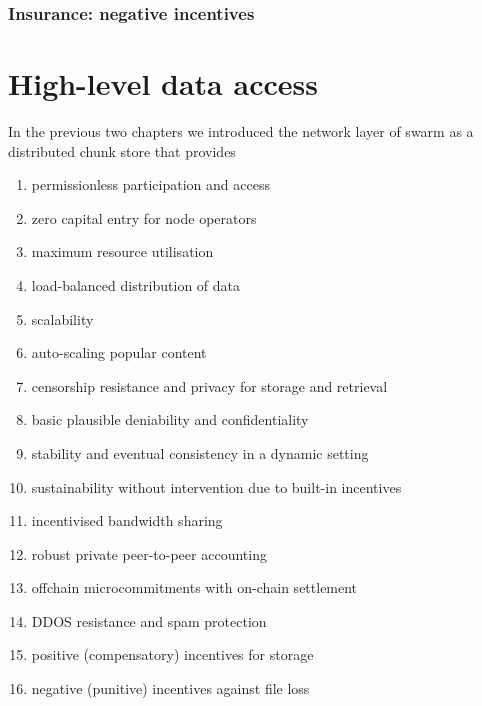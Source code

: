 \subsection{Insurance: negative incentives}\label{sec:chunk-insurace}








\chapter{High-level data access}\label{sec:high-level-data-access}

In the previous two chapters we introduced the network layer of swarm as a distributed chunk store that provides 

\begin{enumerate}
    \item permissionless participation and access
    \item zero capital entry for node operators
    \item maximum resource utilisation 
    \item load-balanced distribution of data
    \item scalability 
    \item auto-scaling popular content
    \item censorship resistance and privacy for storage and retrieval
    \item basic plausible deniability and confidentiality 
    \item stability and eventual consistency in a dynamic setting
    \item sustainability without intervention due to built-in incentives
    \item incentivised bandwidth sharing
    \item robust private peer-to-peer accounting 
    \item offchain microcommitments with on-chain settlement
    \item DDOS resistance and spam protection
    \item positive (compensatory) incentives for storage
    \item negative (punitive) incentives against file loss
\end{enumerate}

